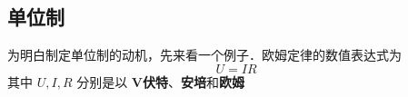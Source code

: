 
\subsection{单位制}
为明白制定单位制的动机，先来看一个例子．欧姆定律的数值表达式为
\begin{equation}
U=IR
\end{equation}
其中 $U,I,R$ 分别是以 \textbf{$\boldsymbol{V}$伏特}、\textbf{安培}和\textbf{欧姆}